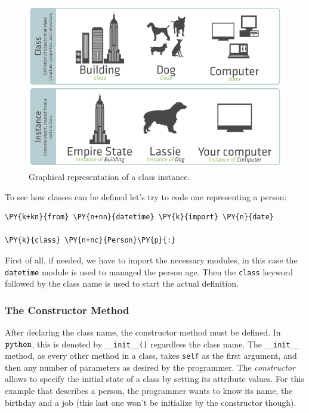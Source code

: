 \begin{figure}[htb]
  \centering
  \includegraphics[width=0.8\linewidth]{figures/classes_instances.png}
  \caption{Graphical representation of a class instance.}
  \label{fig:classes}
\end{figure}

To see how classes can be defined let's try to code one representing a person:
\begin{codebox}
\begin{Verbatim}[commandchars=\\\{\}]
\PY{k+kn}{from} \PY{n+nn}{datetime} \PY{k}{import} \PY{n}{date}        

\PY{k}{class} \PY{n+nc}{Person}\PY{p}{:}
\end{Verbatim}
\end{codebox}

First of all, if needed, we have to import the necessary modules, in this case the 
\texttt{datetime} module is used to managed the person age.
Then the \texttt{class} keyword followed by the class name is used to start the actual definition.

\subsubsection{The Constructor Method}\label{the-constructor-method}

After declaring the class name, the constructor method must be defined.
In \(\tt{python}\), this is denoted by \texttt{\_\_init\_\_()}
regardless the class name. The \texttt{\_\_init\_\_} method, as every
other method in a class, takes \texttt{self} as the first argument, and then any
number of parameters as desired by the programmer. The \emph{constructor}
allows to specify the initial state of a class by setting its attribute
values. For this example that describes a person, the programmer wants
to know its name, the birthday and a job (this last one won't be initialize by the constructor though).

